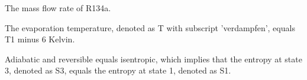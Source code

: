 The mass flow rate of R134a.

The evaporation temperature, denoted as T with subscript 'verdampfen', equals T1 minus 6 Kelvin.

Adiabatic and reversible equals isentropic, which implies that the entropy at state 3, denoted as S3, equals the entropy at state 1, denoted as S1.